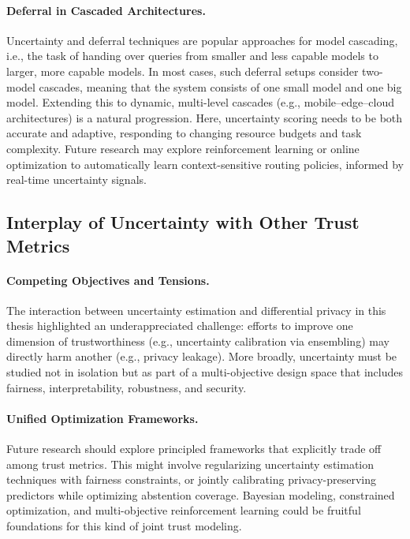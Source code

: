 \paragraph{Deferral in Cascaded Architectures.} 

Uncertainty and deferral techniques are popular approaches for model cascading, i.e., the task of handing over queries from smaller and less capable models to larger, more capable models. In most cases, such deferral setups consider two-model cascades, meaning that the system consists of one small model and one big model. Extending this to dynamic, multi-level cascades (e.g., mobile–edge–cloud architectures) is a natural progression. Here, uncertainty scoring needs to be both accurate and adaptive, responding to changing resource budgets and task complexity. Future research may explore reinforcement learning or online optimization to automatically learn context-sensitive routing policies, informed by real-time uncertainty signals.

\subsection{Interplay of Uncertainty with Other Trust Metrics}

\paragraph{Competing Objectives and Tensions.} The interaction between uncertainty estimation and differential privacy in this thesis highlighted an underappreciated challenge: efforts to improve one dimension of trustworthiness (e.g., uncertainty calibration via ensembling) may directly harm another (e.g., privacy leakage). More broadly, uncertainty must be studied not in isolation but as part of a multi-objective design space that includes fairness, interpretability, robustness, and security.

\paragraph{Unified Optimization Frameworks.} Future research should explore principled frameworks that explicitly trade off among trust metrics. This might involve regularizing uncertainty estimation techniques with fairness constraints, or jointly calibrating privacy-preserving predictors while optimizing abstention coverage. Bayesian modeling, constrained optimization, and multi-objective reinforcement learning could be fruitful foundations for this kind of joint trust modeling.


